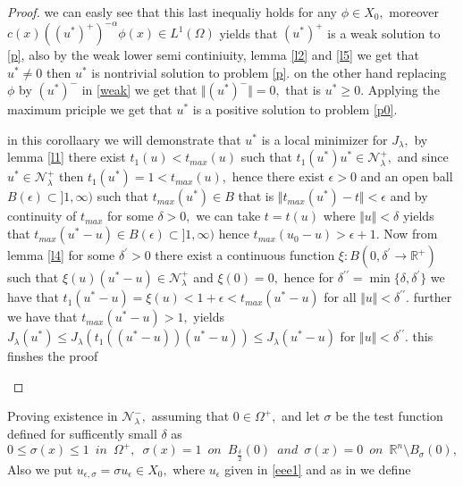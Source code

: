 \documentclass[10pt,twoside,reqno,centertags,draft]{amsart}
\begin{document}
\begin{proof}
we can easly see that this last inequaliy holds for any $ \phi \in X_0,$ moreover \newline
$ c(x) ((u^*)^+)^{-\alpha} \phi(x) \in L^{1}(\Omega)$ yields that $ (u^*)^+$ is a weak solution to \ref{p}, also by the weak lower semi continiuity, lemma \ref{l2} and \ref{l5} we get that $ u^* \neq 0$ then $ u^*$ is nontrivial solution to problem \ref{p}. on the other hand replacing $ \phi $ by $ (u^*)^-$ in \ref{weak} we get that $ \Vert (u^*)^-\Vert =0,$ that is  $ u^* \geq 0.$ Applying the maximum priciple we get that $ u^*$ is a positive solution to problem \ref{p0}.
\begin{corollary}
in this corollaary we will demonstrate that $ u^*$ is a local minimizer for $ J_{\lambda},$ by lemma \ref{l1} there exist $ t_1(u) <t_{max}(u)$ such that 
$ t_1(u^*)u^* \in \mathcal{N}_{\lambda}^{+},$ and since $ u^* \in \mathcal{N}_{\lambda}^{+}$ then $ t_1(u^*) =1 <t_{max}(u),$ hence there exist $ \epsilon >0$ and an open ball $ B(\epsilon)\subset ]1,\infty)$ such that $ t_{max}(u^*) \in B$ that is $ \Vert t_{max}(u^*) -t\Vert < \epsilon$ and by continuity of $ t_{max}$ for some $ \delta >0,$ we can take $ t =t(u)$ where $ \Vert u\Vert <\delta $ yields that $ t_{max}(u^* -u) \in B(\epsilon) \subset ]1,\infty)$
hence $  t_{max}(u_0 -u) >\epsilon +1.$ Now from lemma \ref{l4} for some $ \delta^{\prime} >0$ there exist a continuous function $ \xi:B(0,\delta^{\prime} \to \mathbb{R}^{+})$ such that $ \xi(u)(u^* -u) \in \mathcal{N}_{\lambda}^{+}$ and $ \xi(0) =0,$ hence for $ \delta^{\prime\prime} =\min\{\delta,\delta^{\prime}\}$ 
we have that $ t_1(u^* -u) = \xi(u) < 1 +\epsilon <t_{max}(u^* -u)$ for all $\Vert u\Vert <\delta^{\prime\prime}.$ further we have that 
$ t_{max}(u^* -u) >1,$ yields $ J_{\lambda}(u^*) \leq J_{\lambda}(t_1((u^* -u))(u^* -u)) \leq J_{\lambda}(u^* -u)$ for $ \Vert u\Vert <\delta^{\prime\prime}.$  
this finshes the proof
\end{corollary}
\end{proof}
Proving existence in  $ \mathcal{N}_{\lambda}^{-},$ assuming that $ 0 \in \Omega^{+},$ and let $ \sigma$ be the test function defined for sufficently 
small $ \delta$ as
\begin{equation}\label{eee10}
0 \leq \sigma(x) \leq 1 \,\,\, \textit{in} \,\,\, \Omega^{+}, \,\,\, \sigma(x) =1 \,\,\, \textit{on} \,\,\, B_{\frac{\delta}{2}}(0) \,\,\, \textit{and}\,\,\,
\sigma(x) =0 \,\,\, \textit{on} \,\,\, \mathbb{R}^{n}\setminus B_{\sigma}(0),
\end{equation}
Also we put $ u_{\epsilon, \sigma} =\sigma u_{\epsilon} \in X_0,$ where $ u_{\epsilon}$ given in \ref{eee1} and as in \cite{tarantello1992nonhomogeneous} we define
\end{document}
